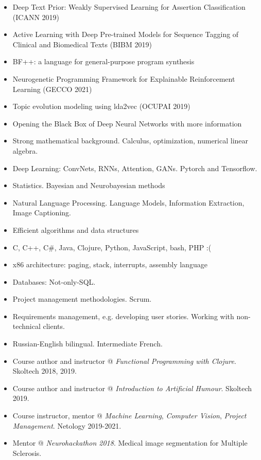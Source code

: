

\begin{itemize}
    \item Deep Text Prior: Weakly Supervised Learning for Assertion Classification (ICANN 2019)
    \item Active Learning with Deep Pre-trained Models for Sequence Tagging of Clinical and Biomedical Texts (BIBM 2019)
    \item BF++: a language for general-purpose program synthesis
    \item Neurogenetic Programming Framework for Explainable Reinforcement Learning (GECCO 2021)
    \item Topic evolution modeling using lda2vec (OCUPAI 2019\footnotemark)
    \item Opening the Black Box of Deep Neural Networks with more information \footnotemark
\end{itemize}


\begin{itemize}
    \item Strong mathematical background. Calculus, optimization, numerical linear algebra.
    \item Deep Learning: ConvNets, RNNs, Attention, GANs. Pytorch and Tensorflow.
    \item Statistics. Bayesian and Neurobayesian methods
    \item Natural Language Processing. Language Models, Information Extraction, Image Captioning.
    \item Efficient algorithms and data structures
    \item C, C++, C\#, Java, Clojure, Python, JavaScript, bash, PHP :(
    \item x86 architecture: paging, stack, interrupts, assembly language
    \item Databases: Not-only-SQL.
    \item Project management methodologies. Scrum.
    \item Requirements management, e.g. developing user stories. Working with non-technical clients.
    \item Russian-English bilingual. Intermediate French.
\end{itemize}

\begin{itemize}
    \item Course author and instructor @ \emph{Functional Programming with Clojure}. Skoltech 2018, 2019. 
    \item Course author and instructor @ \emph{Introduction to Artificial Humour}. Skoltech 2019.
    \item Course instructor, mentor @ \emph{Machine Learning}, \emph{Computer Vision}, \emph{Project Management}. Netology 2019-2021.
    \item Mentor @ \emph{Neurohackathon 2018}. Medical image segmentation for Multiple Sclerosis.
\end{itemize}


